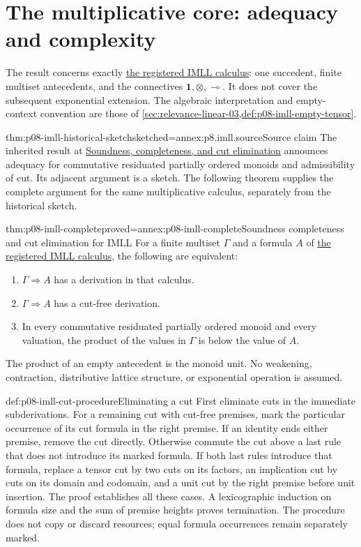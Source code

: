 \section{The multiplicative core: adequacy and complexity}
\label{sec:p08-imll-complete}

The result concerns exactly \hyperref[sheet:imll]{the registered IMLL calculus}: one succedent, finite
multiset antecedents, and the connectives \(\mathbf1,\otimes,\multimap\).
It does not cover the subsequent exponential extension.
The algebraic interpretation and empty-context convention are those of
\cref{sec:relevance-linear-03,def:p08-imll-empty-tensor}.

\begin{hbtheorem}{thm:p08-imll-historical-sketch}{sketched=annex:p8.imll.source}{Source claim}
The inherited result at
\hyperref[thm:p08-source-imll-adequacy]{Soundness, completeness, and cut elimination}
announces adequacy for commutative residuated partially ordered monoids
and admissibility of cut. Its adjacent argument is a sketch.
The following theorem supplies the complete argument for the same
multiplicative calculus, separately from the historical sketch.
\end{hbtheorem}

\begin{hbtheorem}{thm:p08-imll-complete}{proved=annex:p08-imll-complete}{Soundness completeness and cut elimination for IMLL}
For a finite multiset \(\Gamma\) and a formula \(A\) of
\hyperref[sheet:imll]{the registered IMLL calculus}, the following are equivalent:
\begin{enumerate}
 \item \(\Gamma\Rightarrow A\) has a derivation in that calculus.
 \item \(\Gamma\Rightarrow A\) has a cut-free derivation.
 \item In every commutative residuated partially ordered monoid and
       every valuation, the product of the values in \(\Gamma\)
       is below the value of \(A\).
\end{enumerate}
The product of an empty antecedent is the monoid unit.
No weakening, contraction, distributive lattice structure, or
exponential operation is assumed.
\end{hbtheorem}

\begin{hbmethod}{def:p08-imll-cut-procedure}{Eliminating a cut}
First eliminate cuts in the immediate subderivations. For a remaining
cut with cut-free premises, mark the particular occurrence of its
cut formula in the right premise. If an identity ends either premise,
remove the cut directly. Otherwise commute the cut above a last rule
that does not introduce its marked formula. If both last rules
introduce that formula, replace a tensor cut by two cuts on its factors,
an implication cut by cuts on its domain and codomain, and a unit cut
by the right premise before unit insertion. The proof establishes all
these cases. A lexicographic induction on formula size and the sum of
premise heights proves termination. The procedure does not copy or
discard resources; equal formula occurrences remain separately marked.
\end{hbmethod}

